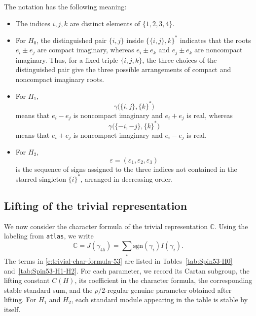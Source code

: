 \documentclass{amsart}
\newcommand{\atlas}{\texttt{atlas}}
\newcommand{\bbC}{{\mathbb{C}}}
\newcommand{\sgn}{{\mathrm{sgn}}}
\theoremstyle{definition}
\begin{document}
The notation has the following meaning:
\begin{itemize}
\item The indices \(i,j,k\) are distinct elements of
\(\{1,2,3,4\}\).

\item For \(H_0\), the distinguished pair \(\{i,j\}\) inside
\(\{\{i,j\},k\}^*\) indicates that the roots
$e_i\pm e_j$
are compact imaginary, whereas
$e_i\pm e_k$ and $e_j\pm e_k$
are noncompact imaginary. Thus, for a fixed triple
\(\{i,j,k\}\), the three choices of the distinguished pair give the
three possible arrangements of compact and noncompact imaginary roots.

\item For \(H_1\),
\[
\gamma\bigl(\{i,j\},\{k\}^*\bigr)
\]
means that \(e_i-e_j\) is noncompact imaginary and \(e_i+e_j\) is real,
whereas
\[
\gamma\bigl(\{-i,-j\},\{k\}^*\bigr)
\]
means that \(e_i+e_j\) is noncompact imaginary and \(e_i-e_j\) is real.

\item For \(H_2\),
\[
\varepsilon=(\varepsilon_1,\varepsilon_2,\varepsilon_3)
\]
is the sequence of signs assigned to the three indices not contained in
the starred singleton \(\{i\}^*\), arranged in decreasing order.
\end{itemize}


\subsection{Lifting of the trivial representation} We now consider the character formula of the trivial representation
\(\bbC\). Using the labeling from \atlas, we write
\begin{equation}\label{e:trivial-char-formula-53}
\bbC
=
J(\gamma_{45})
=
\sum_i \sgn(\gamma_i)I(\gamma_i).
\end{equation}
The terms in \eqref{e:trivial-char-formula-53} are listed in
Tables~\ref{tab:Spin53-H0} and~\ref{tab:Spin53-H1-H2}. For each
parameter, we record its Cartan subgroup, the lifting constant \(C(H)\),
its coefficient in the character formula, the corresponding stable
standard sum, and the \(\rho/2\)-regular genuine parameter obtained
after lifting. For \(H_1\) and \(H_2\), each standard module appearing
in the table is stable by itself.
\end{document}
